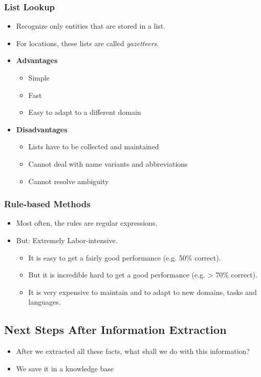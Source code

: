 			\subsubsection{List Lookup} %
				\begin{itemize}
					\item Recognize only entities that are stored in a list.
					\item For locations, these lists are called \textit{gazetteers}.
					\item \textbf{Advantages}
						\begin{itemize}
							\item Simple
							\item Fast
							\item Easy to adapt to a different domain
						\end{itemize}
					\item \textbf{Disadvantages}
						\begin{itemize}
							\item Lists have to be collected and maintained
							\item Cannot deal with name variants and abbreviations
							\item Cannot resolve ambiguity
						\end{itemize}
				\end{itemize}

			\subsubsection{Rule-based Methods} %
				\begin{itemize}
					\item Most often, the rules are regular expressions.
					\item But: Extremely Labor-intensive.
						\begin{itemize}
							\item It is easy to get a fairly good performance (e.g. 50\% correct).
							\item But it is incredible hard to get a good performance (e.g. > 70\% correct).
							\item It is very expensive to maintain and to adapt to new domains, tasks and languages.
						\end{itemize}
				\end{itemize}
		\subsection{Next Steps After Information Extraction} %
			\begin{itemize}
				\item After we extracted all these facts, what shall we do with this information?
				\item We save it in a knowledge base
			\end{itemize}

